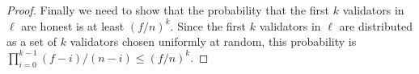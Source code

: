 \begin{proof}
Finally we need to show that the probability that the first $k$ validators in $\ell$ are honest is at least $(f/n)^k$. Since the first $k$ validators in $\ell$ are distributed as a set of $k$ validators chosen uniformly at random, this probability is $\prod_{i=0}^{k-1} (f-i)/(n-i) \leq (f/n)^k$.
\end{proof}